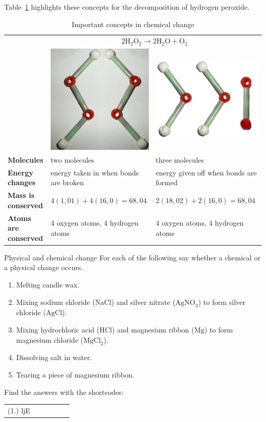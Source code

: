 Table~\ref{tab:chemchangeconcepts} highlights these concepts for the decomposition of hydrogen peroxide.
\begin{table}[H]
 \begin{center}
  \begin{tabular}{|l|l|l|} \hline
& \multicolumn{2}{|c|}{$2\text{H}_{2}\text{O}_{2} \rightarrow 2\text{H}_{2}\text{O} + \text{O}_{2}$} \\ 
& \includegraphics[width=.1\textwidth]{photos/H2O2_models.png} & \includegraphics[width=.1\textwidth]{photos/H2O_O2.png} \\ \hline
   \textbf{Molecules} & two molecules & three molecules \\ \hline
\textbf{Energy changes} & energy taken in when bonds are broken & energy given off when bonds are formed \\ \hline
\textbf{Mass is conserved} & $4(1,01) + 4(16,0) = 68,04$ & $2(18,02) + 2(16,0) = 68,04$ \\ \hline
\textbf{Atoms are conserved} & 4 oxygen atoms, 4 hydrogen atoms & 4 oxygen atoms, 4 hydrogen atoms \\ \hline
  \end{tabular}
 \end{center}
\caption{Important concepts in chemical change}
\label{tab:chemchangeconcepts}
\end{table}
\begin{exercises}{Physical and chemical change}
 For each of the following say whether a chemical or a physical change occurs.
\begin{enumerate}[noitemsep, label=\textbf{\arabic*}. ]
\item Melting candle wax.
\item Mixing sodium chloride ($\text{NaCl}$) and silver nitrate ($\text{AgNO}_3$) to form silver chloride ($\text{AgCl}$).
\item Mixing hydrochloric acid ($\text{HCl}$) and magnesium ribbon ($\text{Mg}$) to form magnesium chloride ($\text{MgCl}_{2}$).
\item Dissolving salt in water.
\item Tearing a piece of magnesium ribbon. 
\end{enumerate}
\par {} Find the answers with the shortcodes:
 \par \begin{tabular}[h]{cccccc}
 (1.) ljE  &    &   &   &    &   & \end{tabular}
\end{exercises}

